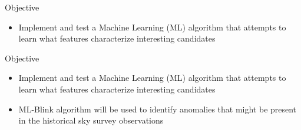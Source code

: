 \begin{frame}{Objective}
    \begin{itemize}
        \item Implement and test a Machine Learning (ML) algorithm that attempts to learn what features characterize interesting candidates
    \end{itemize}
\end{frame}

\begin{frame}{Objective}
    \begin{itemize}
        \item Implement and test a Machine Learning (ML) algorithm that attempts to learn what features characterize interesting candidates
        \item ML-Blink algorithm will be used to identify anomalies that might be present in the historical sky survey observations
    \end{itemize}
\end{frame}